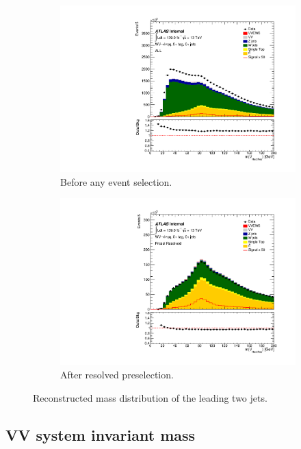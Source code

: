 \begin{figure}[ht]
    \centering
    \begin{subfigure}{0.32\textwidth}
        \includegraphics[width=\linewidth]{figures/event_selection/ALL_MVHadRes.pdf}
        \caption{Before any event selection.}
    \end{subfigure}
    \begin{subfigure}{0.32\textwidth}
        \includegraphics[width=\linewidth]{figures/event_selection/Presel_Resolved_MVHadRes.pdf}
        \caption{After resolved preselection.}
    \end{subfigure}
    \caption{Reconstructed mass distribution of the leading two jets.}
    \label{fig:1lepMVHadResSR}
\end{figure}

\subsection{VV system invariant mass}
\label{subsubsec:mVV_reconstruction}

